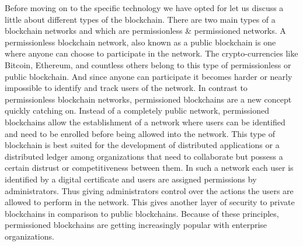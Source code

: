 Before moving on to the specific technology we have opted for let us discuss a little about different types of the blockchain. There are two main types of a blockchain networks and which are permissionless \& permissioned networks. A permissionless blockchain network, also known as a public blockchain is one where anyone can choose to participate in the network. The crypto-currencies like Bitcoin, Ethereum, and countless others belong to this type of permissionless or public blockchain. And since anyone can participate it becomes harder or nearly impossible to identify and track users of the network. In contrast to permissionless blockchain networks, permissioned blockchains are a new concept quickly catching on. Instead of a completely public network, permissioned blockchains allow the establishment of a network where users can be identified and need to be enrolled before being allowed into the network. This type of blockchain is best suited for the development of distributed applications or a distributed ledger among organizations that need to collaborate but possess a certain distrust or competitiveness between them. In such a network each user is identified by a digital certificate and users are assigned permissions by administrators. Thus giving administrators control over the actions the users are allowed to perform in the network. This gives another layer of security to private blockchains in comparison to public blockchains. Because of these principles, permissioned blockchains are getting increasingly popular with enterprise organizations.

